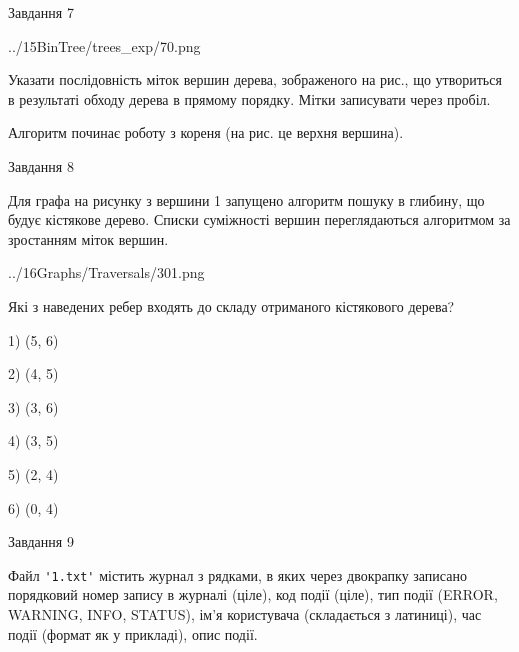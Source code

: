 \documentclass[12pt, ukrainian]{article}
\def\code#1{\Verb!#1!}
\begin{document}
{\vspace{10mm}\par

\newpage
\begin{minipage}[t]{9.7cm}
               
{\begin{center}Завдання {7}\end{center}}
\vspace{-4mm}

\begin{center}
	{../15BinTree/trees_exp/70.png}
\end{center}
Указати послідовність міток вершин дерева, зображеного на рис., що утвориться в результаті обходу дерева в прямому порядку. Мітки записувати через пробіл.\par Алгоритм починає роботу з кореня (на рис. це верхня вершина).\par

\end{minipage}
\vline \hspace{8mm}
\begin{minipage}[t]{8.0cm}
               
{\begin{center}Завдання {8}\end{center}}
\vspace{-4mm}
Для графа на рисунку з вершини 1 запущено алгоритм пошуку в глибину, що будує кістякове дерево. Списки суміжності вершин переглядаються алгоритмом за зростанням міток вершин.\par
\begin{center}
	{../16Graphs/Traversals/301.png}
\end{center}
\par Які з наведених ребер входять до складу отриманого кістякового дерева?\par
1) (5, 6)\par
2) (4, 5)\par
3) (3, 6)\par
4) (3, 5)\par
5) (2, 4)\par
6) (0, 4)\par
{\vskip 15pt} \par

\end{minipage}

               
{\begin{center}Завдання {9}\end{center}}
\vspace{-4mm}
Файл \code{'1.txt'} містить журнал з рядками, в яких через двокрапку записано поряд\-ко\-вий номер запису в журналі (ціле), код події (ціле), тип події (ERROR,\\ WARNING, INFO, STATUS), ім'я користувача (складається з латиниці), час події (фор\-мат як у прикладі), опис події.

}
\end{document}
